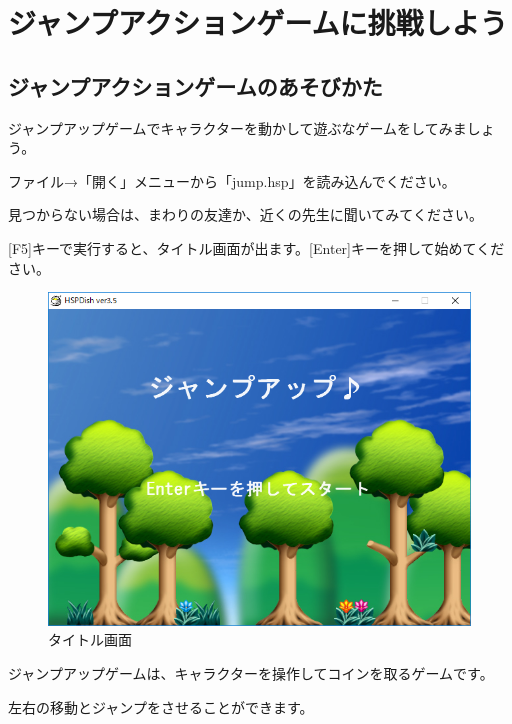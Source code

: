 \newpage

\section{ジャンプアクションゲームに挑戦しよう}


\subsection{ジャンプアクションゲームのあそびかた}



ジャンプアップゲームでキャラクターを動かして遊ぶなゲームをしてみましょう。


ファイル→「開く」メニューから「jump.hsp」を読み込んでください。

見つからない場合は、まわりの友達か、近くの先生に聞いてみてください。

[F5]キーで実行すると、タイトル画面が出ます。[Enter]キーを押して始めてください。


\begin{figure}[H]
    \begin{center}
      \includegraphics[keepaspectratio,width=11.192cm,height=8.827cm]{text04-img/text04-img022.png}
      \caption{タイトル画面}
    \end{center}
    \label{fig:prog_menu}
\end{figure}

ジャンプアップゲームは、キャラクターを操作してコインを取るゲームです。

左右の移動とジャンプをさせることができます。




